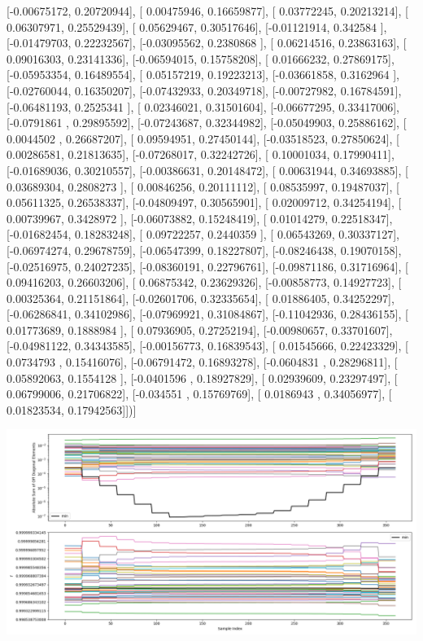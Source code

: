 \documentclass{article}
\begin{document}
       [-0.00675172,  0.20720944],
       [ 0.00475946,  0.16659877],
       [ 0.03772245,  0.20213214],
       [ 0.06307971,  0.25529439],
       [ 0.05629467,  0.30517646],
       [-0.01121914,  0.342584  ],
       [-0.01479703,  0.22232567],
       [-0.03095562,  0.2380868 ],
       [ 0.06214516,  0.23863163],
       [ 0.09016303,  0.23141336],
       [-0.06594015,  0.15758208],
       [ 0.01666232,  0.27869175],
       [-0.05953354,  0.16489554],
       [ 0.05157219,  0.19223213],
       [-0.03661858,  0.3162964 ],
       [-0.02760044,  0.16350207],
       [-0.07432933,  0.20349718],
       [-0.00727982,  0.16784591],
       [-0.06481193,  0.2525341 ],
       [ 0.02346021,  0.31501604],
       [-0.06677295,  0.33417006],
       [-0.0791861 ,  0.29895592],
       [-0.07243687,  0.32344982],
       [-0.05049903,  0.25886162],
       [ 0.0044502 ,  0.26687207],
       [ 0.09594951,  0.27450144],
       [-0.03518523,  0.27850624],
       [ 0.00286581,  0.21813635],
       [-0.07268017,  0.32242726],
       [ 0.10001034,  0.17990411],
       [-0.01689036,  0.30210557],
       [-0.00386631,  0.20148472],
       [ 0.00631944,  0.34693885],
       [ 0.03689304,  0.2808273 ],
       [ 0.00846256,  0.20111112],
       [ 0.08535997,  0.19487037],
       [ 0.05611325,  0.26538337],
       [-0.04809497,  0.30565901],
       [ 0.02009712,  0.34254194],
       [ 0.00739967,  0.3428972 ],
       [-0.06073882,  0.15248419],
       [ 0.01014279,  0.22518347],
       [-0.01682454,  0.18283248],
       [ 0.09722257,  0.2440359 ],
       [ 0.06543269,  0.30337127],
       [-0.06974274,  0.29678759],
       [-0.06547399,  0.18227807],
       [-0.08246438,  0.19070158],
       [-0.02516975,  0.24027235],
       [-0.08360191,  0.22796761],
       [-0.09871186,  0.31716964],
       [ 0.09416203,  0.26603206],
       [ 0.06875342,  0.23629326],
       [-0.00858773,  0.14927723],
       [ 0.00325364,  0.21151864],
       [-0.02601706,  0.32335654],
       [ 0.01886405,  0.34252297],
       [-0.06286841,  0.34102986],
       [-0.07969921,  0.31084867],
       [-0.11042936,  0.28436155],
       [ 0.01773689,  0.1888984 ],
       [ 0.07936905,  0.27252194],
       [-0.00980657,  0.33701607],
       [-0.04981122,  0.34343585],
       [-0.00156773,  0.16839543],
       [ 0.01545666,  0.22423329],
       [ 0.0734793 ,  0.15416076],
       [-0.06791472,  0.16893278],
       [-0.0604831 ,  0.28296811],
       [ 0.05892063,  0.1554128 ],
       [-0.0401596 ,  0.18927829],
       [ 0.02939609,  0.23297497],
       [ 0.06799006,  0.21706822],
       [-0.034551  ,  0.15769769],
       [ 0.0186943 ,  0.34056977],
       [ 0.01823534,  0.17942563]])]
\begin{center}
\includegraphics[scale=.9]{report_pickled_controls233/control_dpn_all.png}

\end{center}
\end{document}
